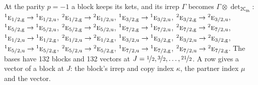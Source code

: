 \documentclass[10pt,a4paper]{article}
\numberwithin{equation}{section}
\newcommand{\grp}[1]{\mathsf{#1}}
\newcommand{\irr}[1]{\text{\normalfont\scshape #1}}
\newcommand{\conjpair}[1]{{}^{#1}}
\newcommand{\ptag}[1]{\mathrm{#1}}
\newcommand{\irrprod}{\otimes}
\newcommand{\mult}{\kappa}
\newcommand{\intx}{\mu}
\begin{document}
At the parity $p = -1$ a block keeps its kets, and its irrep $\Gamma$ becomes $\Gamma \irrprod \det_{\grp{2C_{8h}}}$: $\conjpair{1}\irr{e}_{1/2,\ptag{g}} \to \conjpair{1}\irr{e}_{1/2,\ptag{u}}$, $\conjpair{2}\irr{e}_{1/2,\ptag{g}} \to \conjpair{2}\irr{e}_{1/2,\ptag{u}}$, $\conjpair{1}\irr{e}_{3/2,\ptag{g}} \to \conjpair{1}\irr{e}_{3/2,\ptag{u}}$, $\conjpair{2}\irr{e}_{3/2,\ptag{g}} \to \conjpair{2}\irr{e}_{3/2,\ptag{u}}$, $\conjpair{1}\irr{e}_{5/2,\ptag{g}} \to \conjpair{1}\irr{e}_{5/2,\ptag{u}}$, $\conjpair{2}\irr{e}_{5/2,\ptag{g}} \to \conjpair{2}\irr{e}_{5/2,\ptag{u}}$, $\conjpair{1}\irr{e}_{7/2,\ptag{g}} \to \conjpair{1}\irr{e}_{7/2,\ptag{u}}$, $\conjpair{2}\irr{e}_{7/2,\ptag{g}} \to \conjpair{2}\irr{e}_{7/2,\ptag{u}}$, $\conjpair{1}\irr{e}_{1/2,\ptag{u}} \to \conjpair{1}\irr{e}_{1/2,\ptag{g}}$, $\conjpair{2}\irr{e}_{1/2,\ptag{u}} \to \conjpair{2}\irr{e}_{1/2,\ptag{g}}$, $\conjpair{1}\irr{e}_{3/2,\ptag{u}} \to \conjpair{1}\irr{e}_{3/2,\ptag{g}}$, $\conjpair{2}\irr{e}_{3/2,\ptag{u}} \to \conjpair{2}\irr{e}_{3/2,\ptag{g}}$, $\conjpair{1}\irr{e}_{5/2,\ptag{u}} \to \conjpair{1}\irr{e}_{5/2,\ptag{g}}$, $\conjpair{2}\irr{e}_{5/2,\ptag{u}} \to \conjpair{2}\irr{e}_{5/2,\ptag{g}}$, $\conjpair{1}\irr{e}_{7/2,\ptag{u}} \to \conjpair{1}\irr{e}_{7/2,\ptag{g}}$, $\conjpair{2}\irr{e}_{7/2,\ptag{u}} \to \conjpair{2}\irr{e}_{7/2,\ptag{g}}$.
The bases have 132 blocks and 132 vectors at $J = \nicefrac{1}{2}, \nicefrac{3}{2}, \dots, \nicefrac{21}{2}$. \label{n:index.copy}\label{n:head.vector}A row gives a vector of a block at $J$: the block's irrep and copy index $\mult$, the partner index $\intx$ and the vector.
\end{document}
